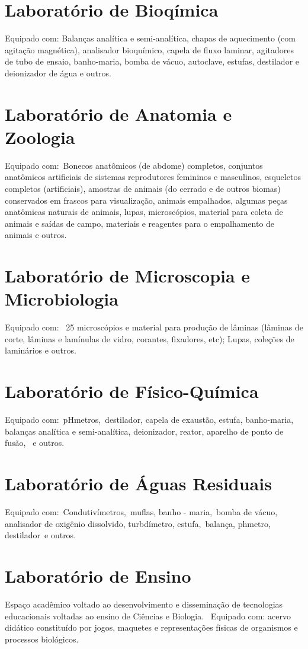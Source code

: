 \documentclass[11pt,fleqn]{book} %
\begin{document}
\section{Laboratório de Bioqímica}
Equipado com: Balanças analítica e semi-analítica, chapas de aquecimento (com agitação magnética), analisador bioquímico, capela de fluxo laminar, agitadores de tubo de ensaio, banho-maria, bomba de vácuo, autoclave, estufas, destilador e deionizador de água e outros.

\section{Laboratório de Anatomia e Zoologia}
Equipado com: Bonecos anatômicos (de abdome) completos, conjuntos anatômicos artificiais de sistemas reprodutores femininos e masculinos, esqueletos completos (artificiais), amostras de animais (do cerrado e de outros biomas) conservados em frascos para visualização, animais empalhados, algumas peças anatômicas naturais de animais, lupas, microscópios, material para coleta de animais e saídas de campo, materiais e reagentes para o empalhamento de animais e outros.

\section{Laboratório de Microscopia e Microbiologia}
Equipado com:  25 microscópios e material para produção de lâminas (lâminas de corte, lâminas e lamínulas de vidro, corantes, fixadores, etc); Lupas, coleções de laminários e outros.

\section{Laboratório de Físico-Química}
Equipado com: pHmetros, destilador, capela de exaustão, estufa, banho-maria, balanças analítica e semi-analítica, deionizador, reator, aparelho de ponto de fusão,  e outros.

\section{Laboratório de Águas Residuais}
Equipado com: Condutivímetros, muflas, banho - maria, bomba de vácuo, analisador de oxigênio dissolvido, turbdímetro, estufa, balança, phmetro, destilador e outros.

\section{Laboratório de Ensino}
Espaço acadêmico voltado ao desenvolvimento e disseminação de tecnologias educacionais voltadas ao ensino de Ciências e Biologia.  Equipado com: acervo didático constituído por jogos, maquetes e representações físicas de organismos e processos biológicos.
\end{document}
